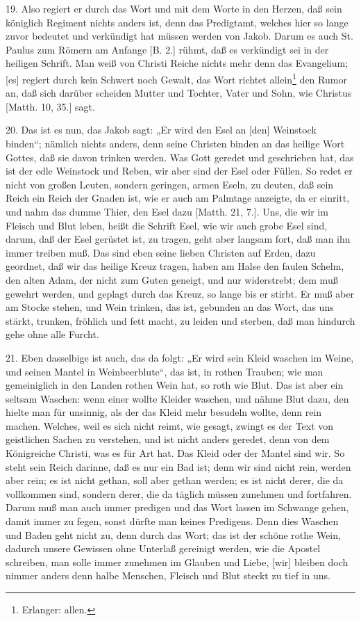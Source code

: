 19. Also regiert er durch das Wort und mit dem Worte in den Herzen, daß sein königlich Regiment nichts anders ist, denn das Predigtamt, welches hier so lange zuvor bedeutet und verkündigt hat müssen werden von Jakob. Darum es auch St. Paulus zum Römern am Anfange [B. 2.] rühmt, daß es verkündigt sei in der heiligen Schrift. Man weiß von Christi Reiche nichts mehr denn das Evangelium; [es] regiert durch kein Schwert noch Gewalt, das Wort richtet allein\footnote{Erlanger: allen.} den Rumor an, daß sich darüber scheiden Mutter und Tochter, Vater und Sohn, wie Christus [Matth. 10, 35.] sagt.

20. Das ist es nun, das Jakob sagt: „Er wird den Esel an [den] Weinstock binden“; nämlich nichts anders, denn seine Christen binden an das heilige Wort Gottes, daß sie davon trinken werden. Was Gott geredet und geschrieben hat, das ist der edle Weinstock und Reben, wir aber sind der Esel oder Füllen. So redet er nicht von großen Leuten, sondern geringen, armen Eseln, zu deuten, daß sein Reich ein Reich der Gnaden ist, wie er auch am Palmtage anzeigte, da er einritt, und nahm das dumme Thier, den Esel dazu [Matth. 21, 7.]. Uns, die wir im Fleisch und Blut leben, heißt die Schrift Esel, wie wir auch grobe Esel sind, darum, daß der Esel gerüstet ist, zu tragen, geht aber langsam fort, daß man ihn immer treiben muß. Das sind eben seine lieben Christen auf Erden, dazu geordnet, daß wir das heilige Kreuz tragen, haben am Halse den faulen Schelm, den alten Adam, der nicht zum Guten geneigt, und nur widerstrebt; dem muß gewehrt werden, und geplagt durch das Kreuz, so lange bis er stirbt. Er muß aber am Stocke stehen, und Wein trinken, das ist, gebunden an das Wort, das uns stärkt, trunken, fröhlich und fett macht, zu leiden und sterben, daß man hindurch gehe ohne alle Furcht.

21. Eben dasselbige ist auch, das da folgt: „Er wird sein Kleid waschen im Weine, und seinen Mantel in Weinbeerblute“, das ist, in rothen Trauben; wie man gemeiniglich in den Landen rothen Wein hat, so roth wie Blut. Das ist aber ein seltsam Waschen: wenn einer wollte Kleider waschen, und nähme Blut dazu, den hielte man für unsinnig, als der das Kleid mehr besudeln wollte, denn rein machen. Welches, weil es sich nicht reimt, wie gesagt, zwingt es der Text von geistlichen Sachen zu verstehen, und ist nicht anders geredet, denn von dem Königreiche Christi, was es für Art hat. Das Kleid oder der Mantel sind wir. So steht sein Reich darinne, daß es nur ein Bad ist; denn wir sind nicht rein, werden aber rein; es ist nicht gethan, soll aber gethan werden; es ist nicht derer, die da vollkommen sind, sondern derer, die da täglich müssen zunehmen und fortfahren. Darum muß man auch immer predigen und das Wort lassen im Schwange gehen, damit immer zu fegen, sonst dürfte man keines Predigens. Denn dies Waschen und Baden geht nicht zu, denn durch das Wort; das ist der schöne rothe Wein, dadurch unsere Gewissen ohne Unterlaß gereinigt werden, wie die Apostel schreiben, man solle immer zunehmen im Glauben und Liebe, [wir] bleiben doch nimmer anders denn halbe Menschen, Fleisch und Blut steckt zu tief in uns.

